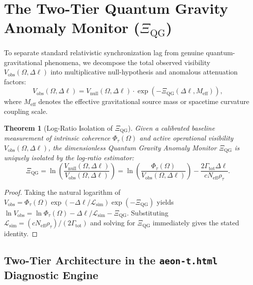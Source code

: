 \documentclass[11pt,a4paper]{article}
\newtheorem{theorem}{Theorem}
\begin{document}
\section{The Two-Tier Quantum Gravity Anomaly Monitor ($\Xi_{\mathrm{QG}}$)}

To separate standard relativistic synchronization lag from genuine quantum-gravitational phenomena, we decompose the total observed visibility $V_{\mathrm{obs}}(\Omega, \Delta\ell)$ into multiplicative null-hypothesis and anomalous attenuation factors:
\begin{equation}
V_{\mathrm{obs}}(\Omega, \Delta\ell) = V_{\mathrm{null}}(\Omega, \Delta\ell)\cdot\exp\!\left(-\Xi_{\mathrm{QG}}(\Delta\ell, M_{\mathrm{eff}})\right),
\end{equation}
where $M_{\mathrm{eff}}$ denotes the effective gravitational source mass or spacetime curvature coupling scale.

\begin{theorem}[Log-Ratio Isolation of $\Xi_{\mathrm{QG}}$]
Given a calibrated baseline measurement of intrinsic coherence $\Phi_{\tau}(\Omega)$ and active operational visibility $V_{\mathrm{obs}}(\Omega, \Delta\ell)$, the dimensionless Quantum Gravity Anomaly Monitor $\Xi_{\mathrm{QG}}$ is uniquely isolated by the log-ratio estimator:
\begin{equation}
\Xi_{\mathrm{QG}} = \ln\!\left(\frac{V_{\mathrm{null}}(\Omega, \Delta\ell)}{V_{\mathrm{obs}}(\Omega, \Delta\ell)}\right) = \ln\!\left(\frac{\Phi_{\tau}(\Omega)}{V_{\mathrm{obs}}(\Omega, \Delta\ell)}\right) - \frac{2\Gamma_{\mathrm{tot}}\Delta\ell}{c N_{\mathrm{eff}}\rho_{\tau}}.
\end{equation}
\end{theorem}

\begin{proof}
Taking the natural logarithm of $V_{\mathrm{obs}} = \Phi_{\tau}(\Omega)\exp(-\Delta\ell / \mathcal{L}_{\mathrm{sim}})\exp(-\Xi_{\mathrm{QG}})$ yields $\ln V_{\mathrm{obs}} = \ln \Phi_{\tau}(\Omega) - \Delta\ell/\mathcal{L}_{\mathrm{sim}} - \Xi_{\mathrm{QG}}$. Substituting $\mathcal{L}_{\mathrm{sim}} = (c N_{\mathrm{eff}}\rho_{\tau})/(2\Gamma_{\mathrm{tot}})$ and solving for $\Xi_{\mathrm{QG}}$ immediately gives the stated identity.
\end{proof}

\subsection{Two-Tier Architecture in the \texttt{aeon-t.html} Diagnostic Engine}
\end{document}
